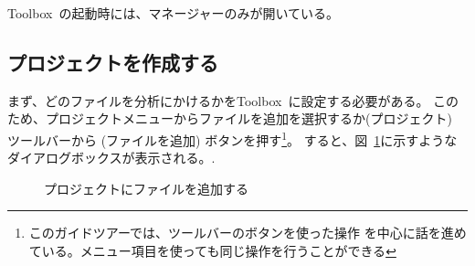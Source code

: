 \documentclass[\pformat,12pt]{jarticle}
\newcommand{\Toolbox}{Toolbox}
\newcommand{\guicmd}[1]{{\gt #1}}
\begin{document}
\Toolbox\ の起動時には、\guicmd{マネージャー}のみが開いている。

\subsection{プロジェクトを作成する}

まず、どのファイルを分析にかけるかを\Toolbox\ に設定する必要がある。
このため、プロジェクトメニューから\guicmd{ファイルを追加}を選択するか(\guicmd{プロジェクト})
ツールバーから  
(\guicmd{ファイルを追加}) ボタンを押す\footnote{このガイドツアーでは、ツールバーのボタンを使った操作
を中心に話を進めている。メニュー項目を使っても同じ操作を行うことができる}。
すると、図~\ref{fig:addFiles}に示すようなダイアログボックスが表示される。.

\begin{figure}[tbh]
\begin{center}
\caption{プロジェクトにファイルを追加する}
\label{fig:addFiles}
\end{center}
\end{figure}
\end{document}
